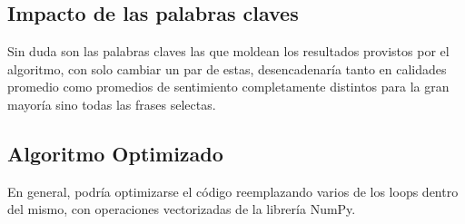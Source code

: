 \documentclass{article}
\begin{document}
\subsection{Impacto de las palabras claves}
Sin duda son las palabras claves las que moldean los resultados provistos por el algoritmo, con solo cambiar un par de estas, desencadenaría tanto en calidades promedio como promedios de sentimiento completamente distintos para la gran mayoría sino todas las frases selectas.

\subsection{Algoritmo Optimizado}
En general, podría optimizarse el código reemplazando varios de los loops dentro del mismo, con operaciones vectorizadas de la librería NumPy.
\end{document}
